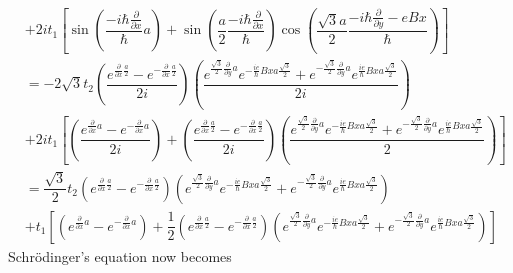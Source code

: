 \documentclass{report}
\newcommand{\f}[2]{\dfrac{#1}{#2}}
\begin{document}
\begin{align*}
	 & + 2i t_1\left[\sin(\f{-i\hbar \frac{\partial}{\partial x}}{\hbar}a) + \sin(\f{a}{2}\f{-i\hbar \frac{\partial}{\partial x}}{\hbar}) \cos(\f{\sqrt{3}a}{2}\f{-i\hbar \frac{\partial}{\partial y} - eBx}{\hbar})\right]                                                                                                                                                                                                                                       \\
	 & = -2\sqrt{3} t_2 \left( \f{e^{\frac{\partial}{\partial x}\frac{a}{2}} - e^{-\frac{\partial}{\partial x}\frac{a}{2}}}{2i} \right) \left( \f{ e^{\frac{\sqrt{3}}{2}\frac{\partial}{\partial y}a } e^{-\frac{ie}{\hbar} Bxa\frac{\sqrt{3}}{2}} + e^{-\frac{\sqrt{3}}{2}\frac{\partial}{\partial y}a } e^{\frac{ie}{\hbar} Bxa\frac{\sqrt{3}}{2}} }{2i} \right)                                                                                                \\
	 & + 2i t_1\left[\left( \f{e^{\frac{\partial}{\partial x}a} - e^{-\frac{\partial}{\partial x}a}}{2i} \right) + \left(\f{e^{\frac{\partial}{\partial x}\frac{a}{2}} - e^{-\frac{\partial}{\partial x}\frac{a}{2}}}{2i}\right)  \left( \f{e^{\frac{\sqrt{3}}{2}\frac{\partial}{\partial y}a } e^{-\frac{ie}{\hbar} Bxa\frac{\sqrt{3}}{2}} + e^{-\frac{\sqrt{3}}{2}\frac{\partial}{\partial y}a } e^{\frac{ie}{\hbar} Bxa\frac{\sqrt{3}}{2}}}{2} \right) \right] \\
	 & = \f{\sqrt{3}}{2} t_2 \left( e^{\frac{\partial}{\partial x}\frac{a}{2}} - e^{-\frac{\partial}{\partial x}\frac{a}{2}} \right) \left( e^{\frac{\sqrt{3}}{2}\frac{\partial}{\partial y}a } e^{-\frac{ie}{\hbar} Bxa\frac{\sqrt{3}}{2}} + e^{-\frac{\sqrt{3}}{2}\frac{\partial}{\partial y}a } e^{\frac{ie}{\hbar} Bxa\frac{\sqrt{3}}{2}}  \right)                                                                                                            \\
	 & + t_1\left[\left( e^{\frac{\partial}{\partial x}a} - e^{-\frac{\partial}{\partial x}a} \right) + \f{1}{2}\left(e^{\frac{\partial}{\partial x}\frac{a}{2}} - e^{-\frac{\partial}{\partial x}\frac{a}{2}}\right)  \left( e^{\frac{\sqrt{3}}{2}\frac{\partial}{\partial y}a } e^{-\frac{ie}{\hbar} Bxa\frac{\sqrt{3}}{2}} + e^{-\frac{\sqrt{3}}{2}\frac{\partial}{\partial y}a } e^{\frac{ie}{\hbar} Bxa\frac{\sqrt{3}}{2}} \right) \right]
\end{align*}
Schr\"{o}dinger's equation now becomes
\end{document}
